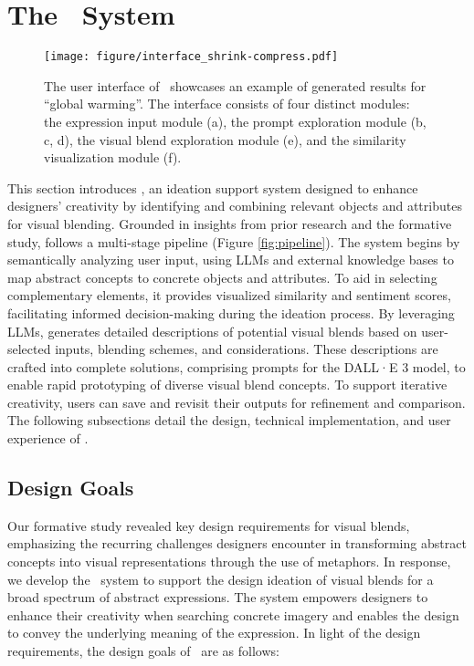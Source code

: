 \section{The \sysname\ System}

\begin{figure*}[t]
  \centering
  \texttt{[image: figure/interface\_shrink-compress.pdf]}
  \caption{The user interface of \sysname\ showcases an example of generated results for ``global warming''. The interface consists of four distinct modules: the expression input module (a), the prompt exploration module (b, c, d), the visual blend exploration module (e), and the similarity visualization module (f).
  }
     \label{fig:interface}
\end{figure*}



This section introduces \sysname, an ideation support system designed to enhance designers' creativity by identifying and combining relevant objects and attributes for visual blending. Grounded in insights from prior research and the formative study, \sysname{} follows a multi-stage pipeline (Figure \ref{fig:pipeline}).
The system begins by semantically analyzing user input, using LLMs and external knowledge bases to map abstract concepts to concrete objects and attributes. 
To aid in selecting complementary elements, it provides visualized similarity and sentiment scores, facilitating informed decision-making during the ideation process.
By leveraging LLMs, \sysname{} generates detailed descriptions of potential visual blends based on user-selected inputs, blending schemes, and considerations. 
These descriptions are crafted into complete solutions, comprising prompts for the DALL·E 3 model, to enable rapid prototyping of diverse visual blend concepts. 
To support iterative creativity, users can save and revisit their outputs for refinement and comparison.
The following subsections detail the design, technical implementation, and user experience of \sysname.



\subsection{Design Goals}



Our formative study revealed key design requirements for visual blends, emphasizing the recurring challenges designers encounter in transforming abstract concepts into visual representations through the use of metaphors.
In response, we develop the \sysname\ system to support the design ideation of visual blends for a broad spectrum of abstract expressions.
The system empowers designers to enhance their creativity when searching concrete imagery and enables the design to convey the underlying meaning of the expression. 
In light of the design requirements, the design goals of \sysname\ are as follows:

